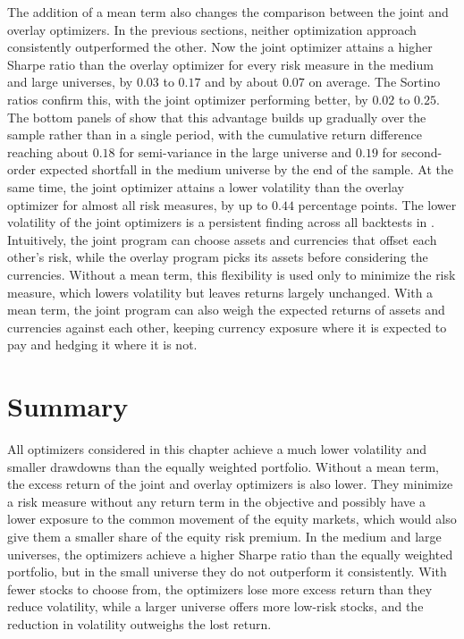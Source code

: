 The addition of a mean term also changes the comparison between the joint and overlay optimizers. In the previous
sections, neither optimization approach consistently outperformed the other. Now the joint optimizer attains a higher Sharpe ratio than
the overlay optimizer for every risk measure in the medium and large universes, by $0.03$ to $0.17$ and by about $0.07$ on average. The Sortino
ratios confirm this, with the joint optimizer performing better, by $0.02$ to $0.25$. The bottom panels of
 show that this advantage builds up gradually over the sample rather than in
a single period, with the cumulative return difference reaching about $0.18$ for semi-variance in the large universe and
$0.19$ for second-order expected shortfall in the medium universe by the end of the sample. At the same time, the joint optimizer attains
a lower volatility than the overlay optimizer for almost all risk measures, by up to $0.44$ percentage
points. The lower volatility of the joint optimizers is a persistent finding across all backtests in
. Intuitively, the joint program can choose assets 
and currencies that offset each other's risk, while the overlay program picks its assets before considering the currencies.
Without a mean term, this flexibility is used only to minimize the risk measure, which lowers
volatility but leaves returns largely unchanged. With a mean term, the joint
program can also weigh the expected returns of assets and currencies against each
other, keeping currency exposure where it is expected to pay and hedging it where
it is not.


\section{Summary} \label{sec:backtest-conclusion}

All optimizers considered in this chapter achieve a much lower volatility and smaller drawdowns than the equally weighted
portfolio. Without a mean term,
the excess return of the joint and overlay optimizers is also lower. They minimize a risk measure without any return term in the
objective and possibly have a lower exposure to the common movement of the equity markets, which would also give them a
smaller share of the equity risk premium. In the medium and large universes, the optimizers achieve a higher Sharpe ratio than the equally
weighted portfolio, but in the small universe they do not outperform it consistently. With fewer stocks to choose from, the optimizers lose more excess return than they
reduce volatility, while a larger universe offers more low-risk stocks, and the
reduction in volatility outweighs the lost return.

